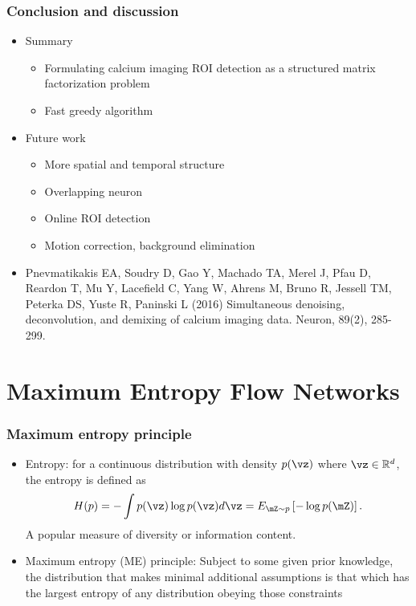 \documentclass[16pt,presentation]{beamer}
\begin{document}
\begin{frame}
\frametitle{Conclusion and discussion}
\begin{itemize}
\item Summary
\begin{itemize}
\item Formulating calcium imaging ROI detection as a structured matrix factorization problem
\item Fast greedy algorithm
\end{itemize}
\item Future work
\begin{itemize}
\item More spatial and temporal structure
\item Overlapping neuron
\item Online ROI detection
\item Motion correction, background elimination
\end{itemize}
\item {\scriptsize Pnevmatikakis EA, Soudry D, \alert{Gao Y}, Machado TA, Merel J, Pfau D, Reardon T, Mu Y, Lacefield C, Yang W, Ahrens M, Bruno R, Jessell TM, Peterka DS, Yuste R, Paninski L (2016) Simultaneous denoising, deconvolution, and demixing of calcium imaging data. Neuron, 89(2), 285-299.}
\end{itemize}
\end{frame}


\section[]{Maximum Entropy Flow Networks}

\begin{frame}
\frametitle{Maximum entropy principle}
\begin{itemize}
\item \alert{Entropy}: for a continuous distribution with density $p(\vz)$ where $\vz \in \mathbb{R}^d$, the entropy is defined as
\[H(p) = - \int p(\vz) \log p(\vz)  d \vz = E_{\mZ \sim p} \left[ -\log p(\mZ) \right].\]
A popular measure of diversity or information content.
\item \alert{Maximum entropy (ME) principle}: Subject to some given prior knowledge, the distribution that makes \alert{minimal additional assumptions} is that which has the \alert{largest entropy} of any distribution obeying those constraints
\end{itemize}
\end{frame}
\end{document}

